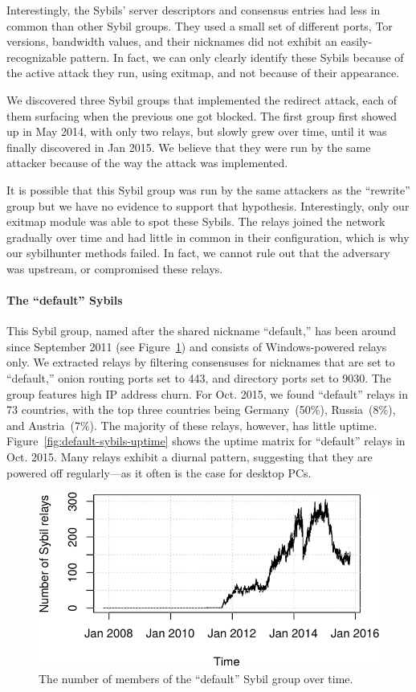 Interestingly, the Sybils' server descriptors and consensus entries had less in
common than other Sybil groups.  They used a small set of different ports, Tor
versions, bandwidth values, and their nicknames did not exhibit an
easily-recognizable pattern.  In fact, we can only clearly identify these Sybils
because of the active attack they run, using exitmap, and not because of their
appearance.

We discovered three Sybil groups that implemented the redirect attack, each of
them surfacing when the previous one got blocked.  The first group first showed
up in May 2014, with only two relays, but slowly grew over time, until it was
finally discovered in Jan 2015.  We believe that they were run by the same
attacker because of the way the attack was implemented.

It is possible that this Sybil group was run by the same attackers as the
``rewrite'' group but we have no evidence to support that hypothesis.
Interestingly, only our exitmap module was able to spot these Sybils.  The
relays joined the network gradually over time and had little in common in their
configuration, which is why our sybilhunter methods failed.  In fact, we cannot
rule out that the adversary was upstream, or compromised these relays.

\paragraph{The ``default'' Sybils}
This Sybil group, named after the shared nickname ``default,'' has been around
since September 2011 (see Figure~\ref{fig:default-over-time}) and consists of
Windows-powered relays only.  We extracted relays by filtering consensuses
for nicknames that are set to ``default,'' onion routing ports set to 443, and
directory ports set to 9030.  The group features high IP address churn.  For
Oct. 2015, we found ``default'' relays in 73 countries, with the top three
countries being Germany~(50\%), Russia~(8\%), and Austria~(7\%).  The majority
of these relays, however, has little uptime.
Figure~\ref{fig:default-sybils-uptime} shows the uptime matrix for ``default''
relays in Oct. 2015.  Many relays exhibit a diurnal pattern, suggesting
that they are powered off regularly---as it often is the case for desktop PCs.

\begin{figure}[t]
	\centering
	\includegraphics[width=\linewidth]{diagrams/default-over-time}
	\caption{The number of members of the ``default'' Sybil group over time.}
	\label{fig:default-over-time}
\end{figure}

